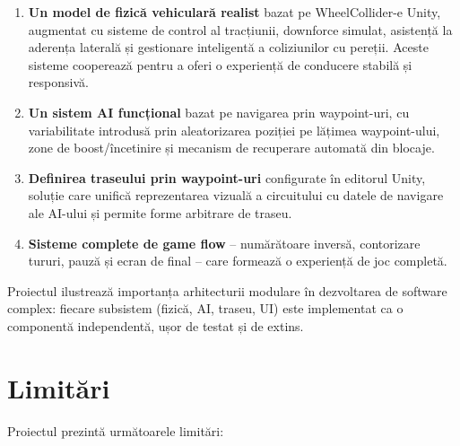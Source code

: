 \documentclass[11pt,twocolumn]{article}
\begin{document}
\begin{enumerate}
    \item \textbf{Un model de fizică vehiculară realist} bazat pe WheelCollider-e Unity, augmentat cu sisteme de control al tracțiunii, downforce simulat, asistență la aderența laterală și gestionare inteligentă a coliziunilor cu pereții. Aceste sisteme cooperează pentru a oferi o experiență de conducere stabilă și responsivă.

    \item \textbf{Un sistem AI funcțional} bazat pe navigarea prin waypoint-uri, cu variabilitate introdusă prin aleatorizarea poziției pe lățimea waypoint-ului, zone de boost/încetinire și mecanism de recuperare automată din blocaje.

    \item \textbf{Definirea traseului prin waypoint-uri} configurate în editorul Unity, soluție care unifică reprezentarea vizuală a circuitului cu datele de navigare ale AI-ului și permite forme arbitrare de traseu.

    \item \textbf{Sisteme complete de game flow} -- numărătoare inversă, contorizare tururi, pauză și ecran de final -- care formează o experiență de joc completă.
\end{enumerate}

Proiectul ilustrează importanța arhitecturii modulare în dezvoltarea de software complex: fiecare subsistem (fizică, AI, traseu, UI) este implementat ca o componentă independentă, ușor de testat și de extins.

\section{Limitări}
\label{sec:limitations}

Proiectul prezintă următoarele limitări:
\end{document}
